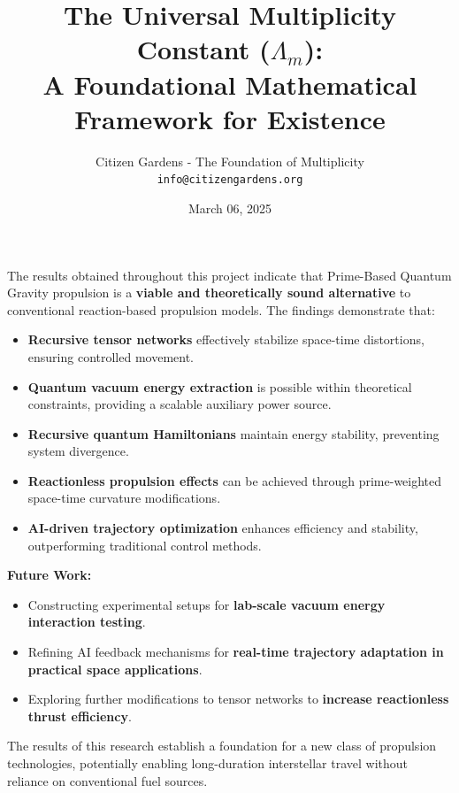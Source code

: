 \documentclass{article}
\theoremstyle{plain}
\begin{document}
The results obtained throughout this project indicate that Prime-Based Quantum Gravity propulsion is a \textbf{viable and theoretically sound alternative} to conventional reaction-based propulsion models. The findings demonstrate that:
\begin{itemize}
    \item \textbf{Recursive tensor networks} effectively stabilize space-time distortions, ensuring controlled movement.
    \item \textbf{Quantum vacuum energy extraction} is possible within theoretical constraints, providing a scalable auxiliary power source.
    \item \textbf{Recursive quantum Hamiltonians} maintain energy stability, preventing system divergence.
    \item \textbf{Reactionless propulsion effects} can be achieved through prime-weighted space-time curvature modifications.
    \item \textbf{AI-driven trajectory optimization} enhances efficiency and stability, outperforming traditional control methods.
\end{itemize}

\textbf{Future Work:}
\begin{itemize}
    \item Constructing experimental setups for \textbf{lab-scale vacuum energy interaction testing}.
    \item Refining AI feedback mechanisms for \textbf{real-time trajectory adaptation in practical space applications}.
    \item Exploring further modifications to tensor networks to \textbf{increase reactionless thrust efficiency}.
\end{itemize}

The results of this research establish a foundation for a new class of propulsion technologies, potentially enabling long-duration interstellar travel without reliance on conventional fuel sources.

\title{\textbf{The Universal Multiplicity Constant ($\Lambda_m$)}: \\ A Foundational Mathematical Framework for Existence}
\author{Citizen Gardens - The Foundation of Multiplicity \\ \texttt{info@citizengardens.org}}
\date{March 06, 2025}
\end{document}
